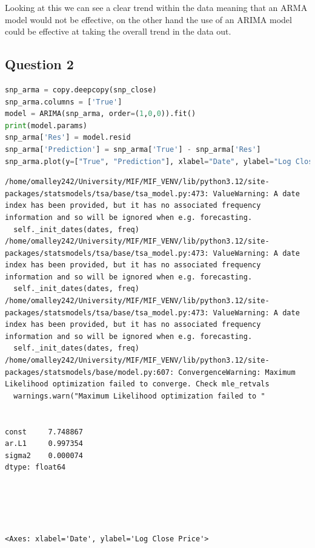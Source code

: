 Looking at this we can see a clear trend within the data meaning that an
ARMA model would not be effective, on the other hand the use of an ARIMA
model could be effective at taking the overall trend in the data out.

\hypertarget{question-2}{%
\subsection{Question 2}\label{question-2}}

\begin{lstlisting}[language=Python]
snp_arma = copy.deepcopy(snp_close)
snp_arma.columns = ['True']
model = ARIMA(snp_arma, order=(1,0,0)).fit()
print(model.params)
snp_arma['Res'] = model.resid
snp_arma['Prediction'] = snp_arma['True'] - snp_arma['Res']
snp_arma.plot(y=["True", "Prediction"], xlabel="Date", ylabel="Log Close Price")
\end{lstlisting}

\begin{lstlisting}
/home/omalley242/University/MIF/MIF_VENV/lib/python3.12/site-packages/statsmodels/tsa/base/tsa_model.py:473: ValueWarning: A date index has been provided, but it has no associated frequency information and so will be ignored when e.g. forecasting.
  self._init_dates(dates, freq)
/home/omalley242/University/MIF/MIF_VENV/lib/python3.12/site-packages/statsmodels/tsa/base/tsa_model.py:473: ValueWarning: A date index has been provided, but it has no associated frequency information and so will be ignored when e.g. forecasting.
  self._init_dates(dates, freq)
/home/omalley242/University/MIF/MIF_VENV/lib/python3.12/site-packages/statsmodels/tsa/base/tsa_model.py:473: ValueWarning: A date index has been provided, but it has no associated frequency information and so will be ignored when e.g. forecasting.
  self._init_dates(dates, freq)
/home/omalley242/University/MIF/MIF_VENV/lib/python3.12/site-packages/statsmodels/base/model.py:607: ConvergenceWarning: Maximum Likelihood optimization failed to converge. Check mle_retvals
  warnings.warn("Maximum Likelihood optimization failed to "


const     7.748867
ar.L1     0.997354
sigma2    0.000074
dtype: float64





<Axes: xlabel='Date', ylabel='Log Close Price'>
\end{lstlisting}

